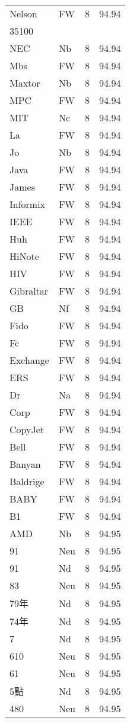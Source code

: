\documentclass[twocolumn]{book}
\begin{document}
\begin{supertabular}{llrr}
Nelson & FW & 8 &  94.94\\
35100\\
NEC & Nb & 8 &  94.94\\
Mbs & FW & 8 &  94.94\\
Maxtor & Nb & 8 &  94.94\\
MPC & FW & 8 &  94.94\\
MIT & Nc & 8 &  94.94\\
La & FW & 8 &  94.94\\
Jo & Nb & 8 &  94.94\\
Java & FW & 8 &  94.94\\
James & FW & 8 &  94.94\\
Informix & FW & 8 &  94.94\\
IEEE & FW & 8 &  94.94\\
Huh & FW & 8 &  94.94\\
HiNote & FW & 8 &  94.94\\
HIV & FW & 8 &  94.94\\
Gibraltar & FW & 8 &  94.94\\
GB & Nf & 8 &  94.94\\
Fido & FW & 8 &  94.94\\
Fc & FW & 8 &  94.94\\
Exchange & FW & 8 &  94.94\\
ERS & FW & 8 &  94.94\\
Dr & Na & 8 &  94.94\\
Corp & FW & 8 &  94.94\\
CopyJet & FW & 8 &  94.94\\
Bell & FW & 8 &  94.94\\
Banyan & FW & 8 &  94.94\\
Baldrige & FW & 8 &  94.94\\
BABY & FW & 8 &  94.94\\
B1 & FW & 8 &  94.94\\
AMD & Nb & 8 &  94.95\\
91 & Neu & 8 &  94.95\\
91 & Nd & 8 &  94.95\\
83 & Neu & 8 &  94.95\\
79年 & Nd & 8 &  94.95\\
74年 & Nd & 8 &  94.95\\
7 & Nd & 8 &  94.95\\
610 & Neu & 8 &  94.95\\
61 & Neu & 8 &  94.95\\
5點 & Nd & 8 &  94.95\\
480 & Neu & 8 &  94.95\\

\end{supertabular}
\end{document}
